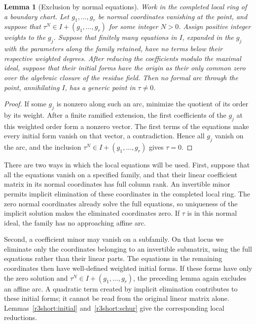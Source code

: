 \documentclass[11pt,a4paper]{article}
\numberwithin{equation}{section}
\theoremstyle{plain}
\newtheorem{lemma}[theorem]{Lemma}
\theoremstyle{definition}
\theoremstyle{remark}
\begin{document}
\begin{lemma}[Exclusion by normal equations]\label{r3:normalexclusion}
Work in the completed local ring of a boundary chart. Let
$g_1,\ldots,g_r$ be normal coordinates vanishing at the point, and
suppose that $\tau^N\in I+(g_1,\ldots,g_r)$ for some integer $N>0$.
Assign positive integer weights to the $g_j$. Suppose that finitely
many equations in $I$, expanded in the $g_j$ with the parameters along
the family retained, have no terms below their respective weighted
degrees. After reducing the coefficients modulo the maximal ideal,
suppose that their initial forms have the origin as their only common
zero over the algebraic closure of the residue field.
Then no formal arc through the point, annihilating $I$, has a generic
point in $\tau\ne0$.
\end{lemma}
\begin{proof}
If some $g_j$ is nonzero along such an arc, minimize the quotient of
its order by its weight. After a finite ramified extension, the first
coefficients of the $g_j$ at this weighted order form a nonzero vector.
The first terms of the equations make every initial form vanish on
that vector, a contradiction. Hence all $g_j$ vanish on the arc, and
the inclusion $\tau^N\in I+(g_1,\ldots,g_r)$ gives $\tau=0$.
\end{proof}

There are two ways in which the local equations will be used.
First, suppose that all the equations vanish on a specified
family, and that their linear coefficient matrix in its normal
coordinates has full column rank. An invertible minor permits
implicit elimination of these coordinates in the completed local
ring. The zero normal coordinates already solve the full
equations, so uniqueness of the implicit solution makes the
eliminated coordinates zero. If $\tau$ is in this normal ideal,
the family has no approaching affine arc.

Second, a coefficient minor may vanish on a subfamily. On that
locus we eliminate only the coordinates belonging to an
invertible submatrix, using the full equations rather than their
linear parts. The equations in the remaining coordinates then
have well-defined weighted initial forms. If these forms have
only the zero solution and
$\tau^N\in I+(g_1,\ldots,g_r)$, the preceding lemma again
excludes an affine arc. A quadratic term created by implicit
elimination contributes to these initial forms; it cannot be
read from the original linear matrix alone.
Lemmas~\ref{r3short:initial} and~\ref{r3short:schur} give the
corresponding local reductions.
\end{document}
